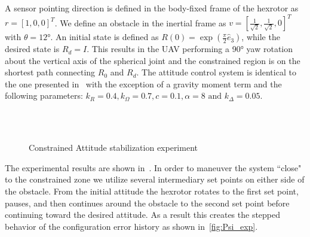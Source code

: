 \documentclass[fleqn]{IJCAS}  %
\begin{document}
\begin{multicols}{2}
A sensor pointing direction is defined in the body-fixed frame of the hexrotor as \( r = [1,0,0]^T \).
We define an obstacle in the inertial frame as \( v = [\frac{1}{\sqrt{2}}, \frac{1}{\sqrt{2}}, 0]^T \) with \( \theta = \ang{12} \).
An initial state is defined as \(R(0) = \exp( \frac{\pi}{2} \hat{e}_3) \), while the desired state is \(R_d =I \).
This results in the UAV performing a \ang{90} yaw rotation about the vertical axis of the spherical joint and the constrained region is on the shortest path connecting $R_0$ and $R_d$. 
The attitude control system is identical to the one presented in~ with the exception of a gravity moment term and the following parameters: \(k_R = 0.4, k_\Omega = 0.7 ,c = 0.1 , \alpha = 8 \text{ and } k_\Delta = 0.05\).
\begin{figure}[H]
	\centering 
    ~
	\\
	~
	\\
	\caption{Constrained Attitude stabilization experiment}
	\label{fig:exp} 
\end{figure}
The experimental results are shown in~.
In order to maneuver the system ``close" to the constrained zone we utilize several intermediary set points on either side of the obstacle.
From the initial attitude the hexrotor rotates to the first set point, pauses, and then continues around the obstacle to the second set point before continuing toward the desired attitude.
As a result this creates the stepped behavior of the configuration error history as shown in~\cref{fig:Psi_exp}.


\end{multicols}
\end{document}
